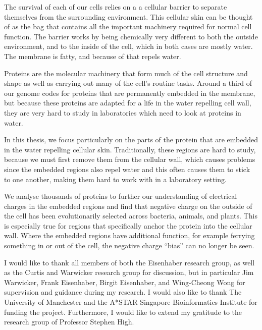 \documentclass[12pt,PhD,twoside]{muthesis}
\begin{document}

The survival of each of our cells relies on a a cellular barrier to separate themselves from the surrounding environment. This cellular skin can be thought of as the bag that contains all the important machinery required for normal cell function. The barrier works by being chemically very different to both the outside environment, and to the inside of the cell, which in both cases are mostly water. The membrane is fatty, and because of that repels water.

Proteins are the molecular machinery that form much of the cell structure and shape as well as carrying out many of the cell's routine tasks. Around a third of our genome codes for proteins that are permanently embedded in the membrane, but because these proteins are adapted for a life in the water repelling cell wall, they are very hard to study in laboratories which need to look at proteins in water.

In this thesis, we focus particularly on the parts of the protein that are embedded in the water repelling cellular skin. Traditionally, these regions are hard to study, because we must first remove them from the cellular wall, which causes problems since the embedded regions also repel water and this often causes them to stick to one another, making them hard to work with in a laboratory setting.

We analyse thousands of proteins to further our understanding of electrical charges in the embedded regions and find that negative charge on the outside of the cell has been evolutionarily selected across bacteria, animals, and plants. This is especially true for regions that specifically anchor the protein into the cellular wall. Where the embedded regions have additional function, for example ferrying something in or out of the cell, the negative charge ``bias'' can no longer be seen.



\afterabstract{} %

I would like to thank all members of both the Eisenhaber research group, as well as the Curtis and Warwicker research group for discussion, but in particular Jim Warwicker, Frank Eisenhaber, Birgit Eisenhaber, and Wing-Cheong Wong for supervision and guidance during my research. I would also like to thank The University of Manchester and the A*STAR Singapore Bioinformatics Institute for funding the project. Furthermore, I would like to extend my gratitude to the research group of Professor Stephen High.
\end{document}
